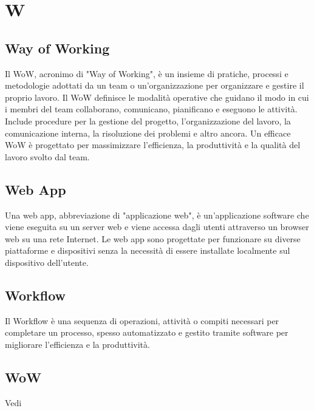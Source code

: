 \section{W}

\vspace{2em}
\subsection*{Way of Working}
\par Il WoW, acronimo di "Way of Working", è un insieme di pratiche, processi e metodologie adottati da un team o un'organizzazione per organizzare e gestire il proprio lavoro. Il WoW definisce le modalità operative che guidano il modo in cui i membri del team collaborano, comunicano, pianificano e eseguono le attività. Include procedure per la gestione del progetto, l'organizzazione del lavoro, la comunicazione interna, la risoluzione dei problemi e altro ancora. Un efficace WoW è progettato per massimizzare l'efficienza, la produttività e la qualità del lavoro svolto dal team.

\vspace{2em}
\subsection*{Web App}
\par Una web app, abbreviazione di "applicazione web", è un'applicazione software che viene eseguita su un server web e viene accessa dagli utenti attraverso un browser web su una rete Internet. Le web app sono progettate per funzionare su diverse piattaforme e dispositivi senza la necessità di essere installate localmente sul dispositivo dell'utente.

\vspace{2em}
\subsection*{Workflow}
\par Il Workflow è una sequenza di operazioni, attività o compiti necessari per completare un processo, spesso automatizzato e gestito tramite software per migliorare l'efficienza e la produttività.

\vspace{2em}
\subsection*{WoW}
\par Vedi 
